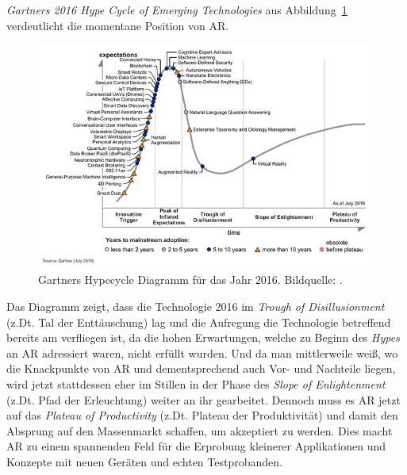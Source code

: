 \textit{Gartners 2016 Hype Cycle of Emerging Technologies} aus Abbildung~\ref{fig:hypecycle} verdeutlicht die momentane Position von AR.
\begin{figure}[H]
	\centering
	\includegraphics[width=1.\textwidth]{figuren/emerging-tech-hc-2016}
	\caption{Gartners Hypecycle Diagramm für das Jahr 2016. Bildquelle: \cite{hype}.}
	\label{fig:hypecycle}
\end{figure}
Das Diagramm zeigt, dass die Technologie 2016 im \textit{Trough of Disillusionment} (z.Dt. Tal der Enttäuschung) lag und die Aufregung die Technologie betreffend bereits am verfliegen ist, da die hohen Erwartungen, welche zu Beginn des \textit{Hypes} an AR adressiert waren, nicht erfüllt wurden. Und da man mittlerweile weiß, wo die Knackpunkte von AR und dementsprechend auch Vor- und Nachteile liegen, wird jetzt stattdessen eher im Stillen in der Phase des \textit{Slope of Enlightenment} (z.Dt. Pfad der Erleuchtung) weiter an ihr gearbeitet. Dennoch muss es AR jetzt auf das \textit{Plateau of Productivity} (z.Dt. Plateau der Produktivität) und damit den Absprung auf den Massenmarkt schaffen, um akzeptiert zu werden. Dies macht AR zu einem spannenden Feld für die Erprobung kleinerer Applikationen und Konzepte mit neuen Geräten und echten Testprobanden.
